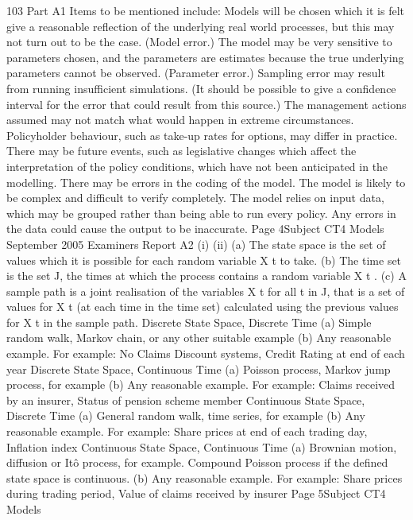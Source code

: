 \documentclass[a4paper,12pt]{article}
\begin{document}
\begin{enumerate}
103 Part
A1
Items to be mentioned include:
Models will be chosen which it is felt give a reasonable reflection of the underlying
real world processes, but this may not turn out to be the case. (Model error.)
The model may be very sensitive to parameters chosen, and the parameters are
estimates because the true underlying parameters cannot be observed. (Parameter
error.)
Sampling error may result from running insufficient simulations. (It should be
possible to give a confidence interval for the error that could result from this source.)
The management actions assumed may not match what would happen in extreme
circumstances.
Policyholder behaviour, such as take-up rates for options, may differ in practice.
There may be future events, such as legislative changes which affect the
interpretation of the policy conditions, which have not been anticipated in the
modelling.
There may be errors in the coding of the model. The model is likely to be complex
and difficult to verify completely.
The model relies on input data, which may be grouped rather than being able to run
every policy. Any errors in the data could cause the output to be inaccurate.
Page 4Subject CT4
Models
September 2005
Examiners Report
A2
(i)
(ii)
(a) The state space is the set of values which it is possible for each random
variable X t to take.
(b) The time set is the set J, the times at which the process contains a random
variable X t .
(c) A sample path is a joint realisation of the variables X t for all t in J, that is a set
of values for X t (at each time in the time set) calculated using the previous
values for X t in the sample path.
Discrete State Space, Discrete Time
(a) Simple random walk, Markov chain, or any other suitable example
(b) Any reasonable example. For example: No Claims Discount systems, Credit
Rating at end of each year
Discrete State Space, Continuous Time
(a) Poisson process, Markov jump process, for example
(b) Any reasonable example. For example: Claims received by an insurer, Status
of pension scheme member
Continuous State Space, Discrete Time
(a) General random walk, time series, for example
(b) Any reasonable example. For example: Share prices at end of each trading
day, Inflation index
Continuous State Space, Continuous Time
(a) Brownian motion, diffusion or Itô process, for example.
Compound Poisson process if the defined state space is continuous.
(b) Any reasonable example. For example: Share prices during trading period,
Value of claims received by insurer
Page 5Subject CT4 Models

\end{enumerate}
\end{document}
